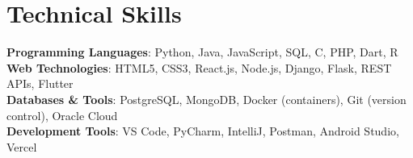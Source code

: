 \documentclass[a4paper,11pt]{article}
\begin{document}
\section{Technical Skills}
\begin{itemize}[leftmargin=0.15in, label={}]
	\small{\item{
			\textbf{Programming Languages}{: Python, Java, JavaScript, SQL, C, PHP, Dart, R}\\
			\textbf{Web Technologies}{: HTML5, CSS3, React.js, Node.js, Django, Flask, REST APIs, Flutter}\\
			\textbf{Databases \& Tools}{: PostgreSQL, MongoDB, Docker (containers), Git (version control), Oracle Cloud}\\
			\textbf{Development Tools}{: VS Code, PyCharm, IntelliJ, Postman, Android Studio, Vercel}
	}}
\end{itemize}
\end{document}
